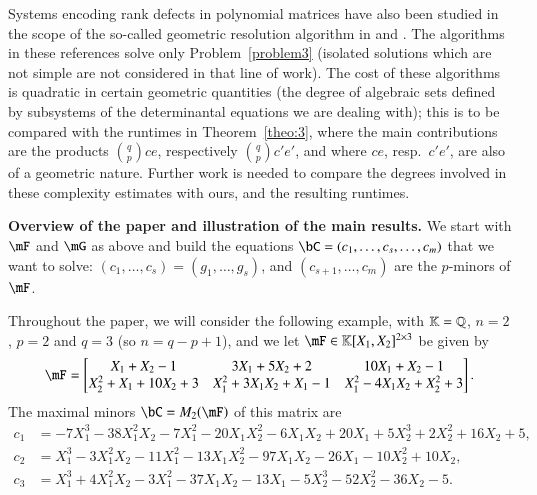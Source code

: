 Systems encoding rank defects in polynomial matrices have also been studied in
the scope of the so-called geometric resolution algorithm in
\cite{BaGiHeLeMaSo15} and \cite{SaSp16}. The algorithms in these references
solve only Problem~\eqref{problem3} (isolated solutions which are not simple are
not considered in that line of work). 
The cost of these algorithms is quadratic in certain geometric quantities (the
degree of algebraic sets defined by subsystems of the determinantal equations we
are dealing with); this is to be compared with the runtimes in
Theorem~\ref{theo:3}, where the main contributions are the products ${q \choose
  p} c e$, respectively ${q \choose p} c' e'$, and where $ce$, resp.\ $c'e'$,
are also of a geometric nature. Further work is needed to compare the degrees
involved in these complexity estimates with ours, and the resulting runtimes.

{\bf Overview of the paper and illustration of the main results.} We start with
$\mF$ and $\mG$ as above and build the equations
$\bC=(c_1,\dots,c_{s},\dots,c_m)$ that we want to solve:
$(c_1,\dots,c_{s})=(g_1,\dots,g_s)$, and $(c_{s+1},\dots,c_{m})$ are the
$p$-minors of $\mF$.

\begin{example}\label{ex:1}
  Throughout the paper, we will consider the following example, with $\mathbb{K}=\mathbb{Q}$,
  $n=2$, $p=2$ and $q=3$ (so $n=q-p+1$), and we let $\mF \in \K[X_1,X_2]^{2
    \times 3}$ be given by
  $$\mF=\begin{bmatrix}
  X_1+X_2-1 & 3X_1+5X_2+2  & 10X_1+X_2-1\\
  X_2^2+X_1+10X_2+3   & X_1^2+3X_1X_2+X_1-1  & X_1^2-4X_1X_2+X_2^2+3
  \end{bmatrix}.$$
  The maximal minors $\bC=M_2(\mF)$ of this matrix are
  \begin{align*}
   c_1&= -7X_1^3 - 38X_1^2X_2 - 7X_1^2 - 20X_1X_2^2 - 6X_1X_2 + 20X_1 + 5X_2^3 +    2X_2^2 + 16X_2 + 5,\\
   c_2&=    X_1^3 - 3X_1^2X_2 - 11X_1^2 - 13X_1X_2^2 - 97X_1X_2 - 26X_1 - 10X_2^2 +    10X_2,\\
   c_3&=    X_1^3 + 4X_1^2X_2 - 3X_1^2 - 37X_1X_2 - 13X_1 - 5X_2^3 - 52X_2^2 - 36X_2 - 5.
  \end{align*}
\end{example}


